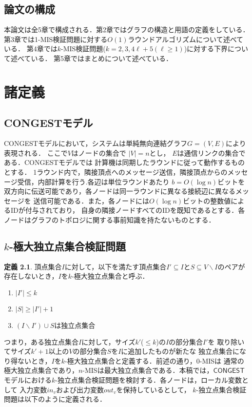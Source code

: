 \documentclass[12pt]{thesis}
\newcommand{\CONGEST}{\textsf{CONGEST}}
\newcommand{\Inp}{\mathit{in}}
\newcommand{\Out}{\mathit{out}}
\theoremstyle{definition}
\newtheorem{definition}{定義}[chapter]
\begin{document}
\section{論文の構成}
本論文は全5章で構成される．第2章ではグラフの構造と用語の定義をしている．
第3章では1-MIS検証問題に対する$O(1)$ラウンドアルゴリズムについて述べている．
第4章では$k$-MIS検証問題($k = 2, 3, 4\ell + 5 (\ell \geq 1)$)に対する下界について述べている．
第5章ではまとめについて述べている．

\chapter{諸定義}

\section{{\CONGEST}モデル}
{\CONGEST}モデルにおいて，システムは単純無向連結グラフ$G =  (V,E)$により表現される．
ここで$V$はノードの集合で $|V| = n$とし， $E$は通信リンクの集合である．{\CONGEST}モデルでは
計算機は同期したラウンドに従って動作するものとする．
1ラウンド内で，隣接頂点へのメッセージ送信，隣接頂点からのメッセージ受信，内部計算を行う.各辺は単位ラウンドあたり
$b = O(\log n)$ビットを双方向に伝送可能であり，各ノードは同一ラウンドに異なる接続辺に異なるメッセージを
送信可能である．また，各ノードには$O(\log n)$ビットの整数値によるIDが付与されており，
自身の隣接ノードすべてのIDを既知であるとする．各ノードはグラフのトポロジに関する事前知識を持たないものとする．

\section{$k$-極大独立点集合検証問題}
\begin{definition}
頂点集合$I$に対して，以下を満たす頂点集合$I' \subseteq I$と$S\subseteq V \backslash I$のペアが
存在しないとき，$I$を$k$-極大独立点集合と呼ぶ．
\begin{enumerate}
\item $|I'| \leq k$
\item $|S| \geq |I'| + 1$
\item $(I \backslash I') \cup S$は独立点集合
\end{enumerate}
\end{definition}
つまり，ある独立点集合$I$に対して，サイズ$k'$($\leq k$)の$I$の部分集合$I'$を
取り除いてサイズ$k' + 1$以上の$V$の部分集合$S$を$I$に追加したものが新たな
独立点集合になり得ないとき，$I$を$k$-極大独立点集合と定義する．前述の通り，$0$-MISは
通常の極大独立点集合であり，$n$-MISは最大独立点集合である．本稿では，${\CONGEST}$
モデルにおける$k$-独立点集合検証問題を検討する．各ノードは，ローカル変数として
入力変数$\Inp_v$および出力変数$\Out_v$を保持しているとして，
$k$-独立点集合検証問題は以下のように定義される．
\end{document}
